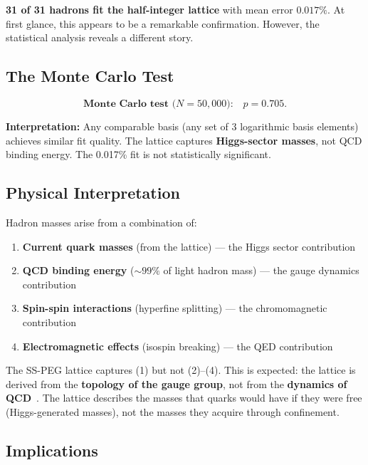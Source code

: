 \textbf{31 of 31 hadrons fit the half-integer lattice} with mean error $0.017\%$. At first glance, this appears to be a remarkable confirmation. However, the statistical analysis reveals a different story.

\subsection{The Monte Carlo Test}\label{sec:hadron_mc}

\begin{equation}
\textbf{Monte Carlo test ($N = 50{,}000$):} \quad p = 0.705.
\end{equation}

\textbf{Interpretation:} Any comparable basis (any set of 3 logarithmic basis elements) achieves similar fit quality. The lattice captures \textbf{Higgs-sector masses}, not QCD binding energy. The 0.017\% fit is not statistically significant.

\subsection{Physical Interpretation}\label{sec:hadron_interpretation}

Hadron masses arise from a combination of:
\begin{enumerate}
\item \textbf{Current quark masses} (from the lattice) --- the Higgs sector contribution
\item \textbf{QCD binding energy} ($\sim 99\%$ of light hadron mass) --- the gauge dynamics contribution
\item \textbf{Spin-spin interactions} (hyperfine splitting) --- the chromomagnetic contribution
\item \textbf{Electromagnetic effects} (isospin breaking) --- the QED contribution
\end{enumerate}

The SS-PEG lattice captures (1) but not (2)--(4). This is expected: the lattice is derived from the \textbf{topology of the gauge group}, not from the \textbf{dynamics of QCD}~\cite{erfanian2024noncommuting}. The lattice describes the masses that quarks would have if they were free (Higgs-generated masses), not the masses they acquire through confinement.

\subsection{Implications}\label{sec:hadron_implications}

